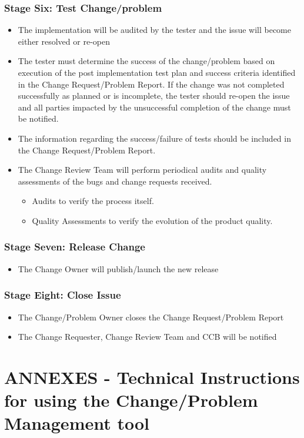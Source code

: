 \documentclass{template/openetcs_article}
\begin{document}
\subsubsection{Stage Six: Test Change/problem}
\begin{itemize}
\item The implementation will be audited by the tester and the issue will become either resolved or re-open
\item The tester must determine the success of the change/problem based on execution of the post implementation test plan and success criteria identified in the Change Request/Problem Report. If the change was not
completed successfully as planned or is incomplete, the tester should re-open the issue and all parties impacted by the unsuccessful completion of the change must be notified.
\item The information regarding the success/failure of tests
should be included in the Change Request/Problem Report.
\item The Change Review Team will perform periodical audits and quality assessments of the bugs and change requests received. 
\begin{itemize}
\item Audits to verify the process itself.
\item Quality Assessments to verify the evolution of the product quality. 
\end{itemize}
\end{itemize}

\subsubsection{Stage Seven: Release Change}
\begin{itemize}
\item The Change Owner will publish/launch the new release
\end{itemize}

\subsubsection{Stage Eight: Close Issue}
\begin{itemize}
\item The Change/Problem Owner closes the Change Request/Problem Report
\item The Change Requester, Change Review Team and CCB will be notified
\end{itemize}

\section{ANNEXES - Technical Instructions for using the Change/Problem Management tool}
\end{document}
